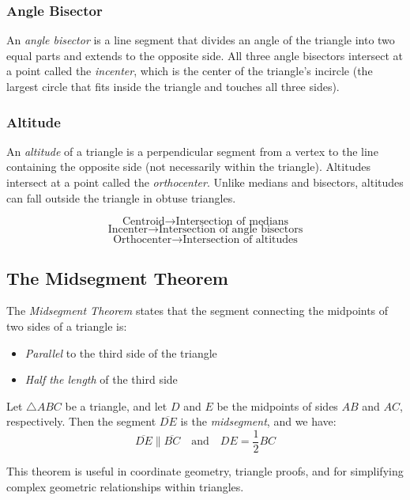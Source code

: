 \subsubsection*{Angle Bisector}

An \emph{angle bisector} is a line segment that divides an angle of the triangle into two equal parts and extends to the opposite side. All three angle bisectors intersect at a point called the \emph{incenter}, which is the center of the triangle's incircle (the largest circle that fits inside the triangle and touches all three sides).

\subsubsection*{Altitude}

An \emph{altitude} of a triangle is a perpendicular segment from a vertex to the line containing the opposite side (not necessarily within the triangle). Altitudes intersect at a point called the \emph{orthocenter}. Unlike medians and bisectors, altitudes can fall outside the triangle in obtuse triangles.

\[
\text{Centroid} \rightarrow \text{Intersection of medians}\]
\[
\text{Incenter} \rightarrow \text{Intersection of angle bisectors}\]
\[
\text{Orthocenter} \rightarrow \text{Intersection of altitudes}
\]

\subsection{The Midsegment Theorem}

The \emph{Midsegment Theorem} states that the segment connecting the midpoints of two sides of a triangle is:

\begin{itemize}[label=\(-\)]
    \item \emph{Parallel} to the third side of the triangle
    \item \emph{Half the length} of the third side
\end{itemize}

Let \( \triangle ABC \) be a triangle, and let \( D \) and \( E \) be the 
midpoints of sides \( AB \) and \( AC \), respectively. Then the segment \( \overline{DE} \) is 
the \emph{midsegment}, and we have:
\[
\overline{DE} \parallel \overline{BC} \quad \text{and} \quad DE = \frac{1}{2} BC
\]

This theorem is useful in coordinate geometry, triangle proofs, 
and for simplifying complex geometric relationships within triangles.

